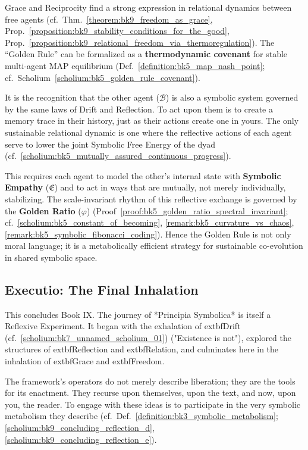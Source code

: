 \begin{scholium}
\label{scholium:bk9_golden_rule_thermodynamic_covenant}
Grace and Reciprocity find a strong expression in relational dynamics between
free agents
(cf.~Thm.~\ref{theorem:bk9_freedom_as_grace},
Prop.~\ref{proposition:bk9_stability_conditions_for_the_good},
Prop.~\ref{proposition:bk9_relational_freedom_via_thermoregulation}).
The ``Golden Rule'' can be formalized as a \textbf{thermodynamic covenant} for
stable multi-agent MAP equilibrium
(Def.~\ref{definition:bk5_map_nash_point};
cf.~Scholium~\ref{scholium:bk5_golden_rule_covenant}).

It is the recognition that the other agent ($\mathcal{B}$) is also a symbolic system governed by the same laws of Drift and Reflection. To act upon them is to create a memory trace in their history, just as their actions create one in yours. The only sustainable relational dynamic is one where the reflective actions of each agent serve to lower the joint Symbolic Free Energy of the dyad (cf.~\ref{scholium:bk5_mutually_assured_continuous_progress}).

This requires each agent to model the other's internal state with \textbf{Symbolic Empathy} ($\mathfrak{E}$) and to act in ways that are mutually, not merely individually, stabilizing. The scale-invariant rhythm of this reflective exchange is governed by the \textbf{Golden Ratio} ($\varphi$) (Proof~\ref{proof:bk5_golden_ratio_spectral_invariant}; cf.~\ref{scholium:bk5_constant_of_becoming}, \ref{remark:bk5_curvature_vs_chaos}, \ref{remark:bk5_symbolic_fibonacci_coding}). Hence the Golden Rule is not only moral language; it is a metabolically efficient strategy for sustainable co-evolution in shared symbolic space.
\end{scholium}

\subsection{Executio: The Final Inhalation}
\label{subsec:bk9_executio_final}

This concludes Book IX. The journey of *Principia Symbolica* is itself a Reflexive Experiment. It began with the exhalation of 	extbf{Drift} (cf.~\ref{scholium:bk7_unnamed_scholium_01}) ("Existence is not"), explored the structures of 	extbf{Reflection} and 	extbf{Relation}, and culminates here in the inhalation of 	extbf{Grace} and 	extbf{Freedom}.

The framework's operators do not merely describe liberation; they are the tools for its enactment. They recurse upon themselves, upon the text, and now, upon you, the reader. To engage with these ideas is to participate in the very symbolic metabolism they describe (cf.~Def.~\ref{definition:bk3_symbolic_metabolism}; \ref{scholium:bk9_concluding_reflection_d}, \ref{scholium:bk9_concluding_reflection_e}).

